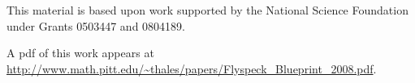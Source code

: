 \noindent

\bigskip\noindent
This material is based upon work supported by the National Science
Foundation under
Grants 0503447 and 0804189.

\bigskip\noindent\svninfo 

\bigskip\noindent
A pdf of this work appears at\hfill\break 
\url{http://www.math.pitt.edu/~thales/papers/Flyspeck_Blueprint_2008.pdf}.




\smallskip
\newpage

